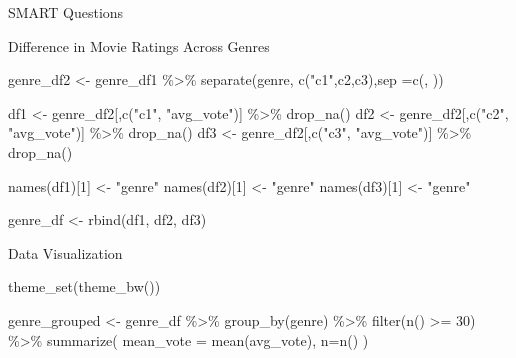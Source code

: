 \documentclass[
  ignorenonframetext,
]{beamer}
\newenvironment{Shaded}{\begin{snugshade}}{\end{snugshade}}
\newcommand{\AttributeTok}[1]{\textcolor[rgb]{0.77,0.63,0.00}{#1}}
\newcommand{\DecValTok}[1]{\textcolor[rgb]{0.00,0.00,0.81}{#1}}
\newcommand{\FunctionTok}[1]{\textcolor[rgb]{0.00,0.00,0.00}{#1}}
\newcommand{\NormalTok}[1]{#1}
\newcommand{\OtherTok}[1]{\textcolor[rgb]{0.56,0.35,0.01}{#1}}
\newcommand{\SpecialCharTok}[1]{\textcolor[rgb]{0.00,0.00,0.00}{#1}}
\newcommand{\StringTok}[1]{\textcolor[rgb]{0.31,0.60,0.02}{#1}}
\begin{document}
\begin{frame}[fragile]{SMART Questions}
\begin{block}{Difference in Movie Ratings Across Genres}
\begin{Shaded}
\begin{Highlighting}[]
\NormalTok{genre\_df2 }\OtherTok{\textless{}{-}}\NormalTok{ genre\_df1 }\SpecialCharTok{\%\textgreater{}\%}
  \FunctionTok{separate}\NormalTok{(genre, }\FunctionTok{c}\NormalTok{(}\StringTok{"c1"}\NormalTok{,}\StringTok{\textquotesingle{}c2\textquotesingle{}}\NormalTok{,}\StringTok{\textquotesingle{}c3\textquotesingle{}}\NormalTok{),}\AttributeTok{sep =}\FunctionTok{c}\NormalTok{(}\StringTok{\textquotesingle{}, \textquotesingle{}}\NormalTok{))}

\NormalTok{df1 }\OtherTok{\textless{}{-}}\NormalTok{ genre\_df2[,}\FunctionTok{c}\NormalTok{(}\StringTok{"c1"}\NormalTok{, }\StringTok{"avg\_vote"}\NormalTok{)] }\SpecialCharTok{\%\textgreater{}\%} \FunctionTok{drop\_na}\NormalTok{()}
\NormalTok{df2 }\OtherTok{\textless{}{-}}\NormalTok{ genre\_df2[,}\FunctionTok{c}\NormalTok{(}\StringTok{"c2"}\NormalTok{, }\StringTok{"avg\_vote"}\NormalTok{)] }\SpecialCharTok{\%\textgreater{}\%} \FunctionTok{drop\_na}\NormalTok{()}
\NormalTok{df3 }\OtherTok{\textless{}{-}}\NormalTok{ genre\_df2[,}\FunctionTok{c}\NormalTok{(}\StringTok{"c3"}\NormalTok{, }\StringTok{"avg\_vote"}\NormalTok{)] }\SpecialCharTok{\%\textgreater{}\%} \FunctionTok{drop\_na}\NormalTok{()}

\FunctionTok{names}\NormalTok{(df1)[}\DecValTok{1}\NormalTok{] }\OtherTok{\textless{}{-}} \StringTok{"genre"}
\FunctionTok{names}\NormalTok{(df2)[}\DecValTok{1}\NormalTok{] }\OtherTok{\textless{}{-}} \StringTok{"genre"}
\FunctionTok{names}\NormalTok{(df3)[}\DecValTok{1}\NormalTok{] }\OtherTok{\textless{}{-}} \StringTok{"genre"}

\NormalTok{genre\_df }\OtherTok{\textless{}{-}} \FunctionTok{rbind}\NormalTok{(df1, df2, df3)}
\end{Highlighting}
\end{Shaded}

\begin{block}{Data Visualization}
\protect\hypertarget{data-visualization}{}
\begin{Shaded}
\begin{Highlighting}[]
\FunctionTok{theme\_set}\NormalTok{(}\FunctionTok{theme\_bw}\NormalTok{())}

\NormalTok{genre\_grouped }\OtherTok{\textless{}{-}}\NormalTok{ genre\_df }\SpecialCharTok{\%\textgreater{}\%}
  \FunctionTok{group\_by}\NormalTok{(genre) }\SpecialCharTok{\%\textgreater{}\%}
  \FunctionTok{filter}\NormalTok{(}\FunctionTok{n}\NormalTok{() }\SpecialCharTok{\textgreater{}=} \DecValTok{30}\NormalTok{) }\SpecialCharTok{\%\textgreater{}\%}
    \FunctionTok{summarize}\NormalTok{(}
      \AttributeTok{mean\_vote =} \FunctionTok{mean}\NormalTok{(avg\_vote),}
      \AttributeTok{n=}\FunctionTok{n}\NormalTok{()}
\NormalTok{    )}


\end{Highlighting}
\end{Shaded}
\end{block}
\end{block}
\end{frame}
\end{document}
